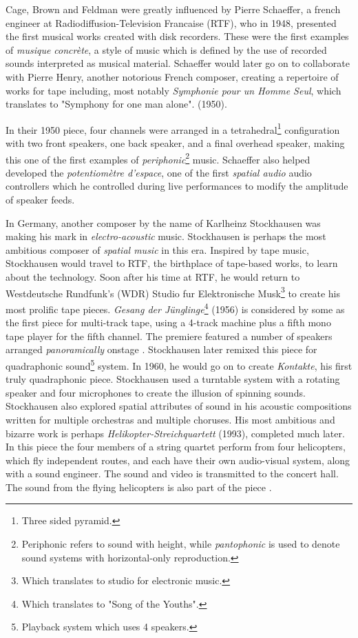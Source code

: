 
Cage, Brown and Feldman were greatly influenced by Pierre Schaeffer, a french engineer at Radiodiffusion-Television Francaise (RTF), who in 1948, presented the first musical works created with disk recorders. These were the first examples of \textit{musique concrète}, a style of music which is defined by the use of recorded sounds interpreted as musical material. Schaeffer would later go on to collaborate with Pierre Henry, another notorious French composer, creating a repertoire of works for tape including, most notably \textit{Symphonie pour un Homme Seul}, which translates to "Symphony for one man alone". (1950). 

In their 1950 piece, four channels were arranged in a tetrahedral\footnote{Three sided pyramid.} configuration with two front speakers, one back speaker, and a final overhead speaker, making this one of the first examples of \textit{periphonic}\footnote{Periphonic refers to sound with height, while \textit{pantophonic} is used to denote sound systems with horizontal-only reproduction.} music. Schaeffer also helped developed the \textit{potentiomètre d'espace}, one of the first \textit{spatial audio} audio controllers which he controlled during live performances to modify the amplitude of speaker feeds. 

In Germany, another composer by the name of Karlheinz Stockhausen was making his mark in \textit{electro-acoustic} music. Stockhausen is perhaps the most ambitious composer of \textit{spatial music} in this era. Inspired by tape music, Stockhausen would travel to RTF, the birthplace of tape-based works, to learn about the technology. Soon after his time at RTF, he would return to Westdeutsche Rundfunk's (WDR) Studio fur Elektronische Musk\footnote{Which translates to studio for electronic music.} to create his most prolific tape pieces. \textit{Gesang der Jünglinge}\footnote{Which translates to "Song of the Youths".} (1956) is considered by some as the first piece for multi-track tape, using a 4-track machine plus a fifth mono tape player for the fifth channel. The premiere featured a number of speakers arranged \textit{panoramically} onstage \cite{zvonar1999history}. Stockhausen later remixed this piece for quadraphonic sound\footnote{Playback system which uses 4 speakers.} system. In 1960, he would go on to create \textit{Kontakte}, his first truly quadraphonic piece. Stockhausen used a turntable system with a rotating speaker and four microphones to create the illusion of spinning sounds. Stockhausen also explored spatial attributes of sound in his acoustic compositions written for multiple orchestras and multiple choruses. His most ambitious and bizarre work is perhaps \textit{Helikopter-Streichquartett} (1993), completed much later. In this piece the four members of a string quartet perform from four helicopters, which fly independent routes, and each have their own audio-visual system, along with a sound engineer. The sound and video is transmitted to the concert hall. The sound from the flying helicopters is also part of the piece \cite{stockhausen1996helikopter}. 

